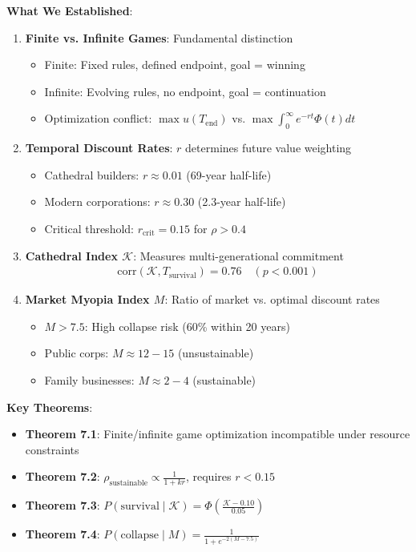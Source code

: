 \documentclass[11pt,a4paper]{article}
\theoremstyle{definition}
\theoremstyle{remark}
\begin{document}
\begin{small}
\begin{enumerate}
\begin{mdframed}[backgroundcolor=green!10,linewidth=2pt,linecolor=green!70!black]
\textbf{What We Established}:
\begin{enumerate}[nosep]
    \item \textbf{Finite vs. Infinite Games}: Fundamental distinction
        \begin{itemize}[nosep]
            \item Finite: Fixed rules, defined endpoint, goal = winning
            \item Infinite: Evolving rules, no endpoint, goal = continuation
            \item Optimization conflict: \(\max u(T_{\text{end}})\) vs. \(\max \int_0^\infty e^{-rt}\Phi(t)dt\)
        \end{itemize}
    \item \textbf{Temporal Discount Rates}: \(r\) determines future value weighting
        \begin{itemize}[nosep]
            \item Cathedral builders: \(r \approx 0.01\) (69-year half-life)
            \item Modern corporations: \(r \approx 0.30\) (2.3-year half-life)
            \item Critical threshold: \(r_{\text{crit}} = 0.15\) for \(\rho > 0.4\)
        \end{itemize}
    \item \textbf{Cathedral Index \(\mathcal{K}\)}: Measures multi-generational commitment
        \begin{align}
        \text{corr}(\mathcal{K}, T_{\text{survival}}) = 0.76 \quad (p < 0.001)
        \end{align}
    \item \textbf{Market Myopia Index \(M\)}: Ratio of market vs. optimal discount rates
        \begin{itemize}[nosep]
            \item \(M > 7.5\): High collapse risk (60\% within 20 years)
            \item Public corps: \(M \approx 12-15\) (unsustainable)
            \item Family businesses: \(M \approx 2-4\) (sustainable)
        \end{itemize}
\end{enumerate}

\textbf{Key Theorems}:
\begin{itemize}[nosep]
    \item \textbf{Theorem 7.1}: Finite/infinite game optimization incompatible under resource constraints
    \item \textbf{Theorem 7.2}: \(\rho_{\text{sustainable}} \propto \frac{1}{1+kr}\), requires \(r < 0.15\)
    \item \textbf{Theorem 7.3}: \(P(\text{survival} \mid \mathcal{K}) = \Phi\left(\frac{\mathcal{K}-0.10}{0.05}\right)\)
    \item \textbf{Theorem 7.4}: \(P(\text{collapse} \mid M) = \frac{1}{1+e^{-2(M-7.5)}}\)
\end{itemize}


\end{mdframed}
\end{enumerate}
\end{small}
\end{document}
